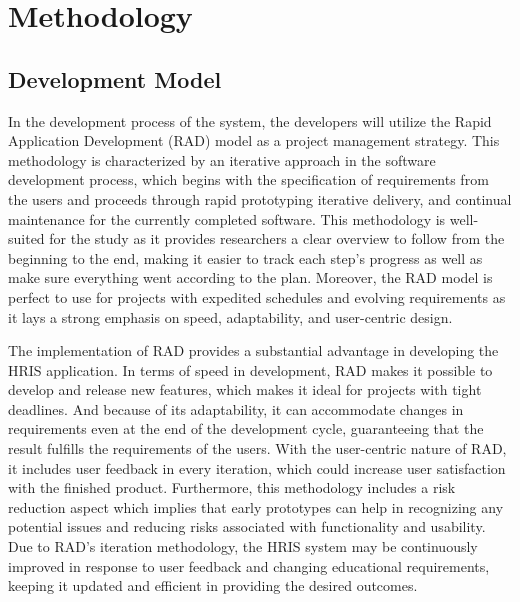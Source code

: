 \chapter{Methodology}

\section{Development Model}
In the development process of the system, the developers will utilize the Rapid Application Development (RAD) model as a project management strategy. This methodology is characterized by an iterative approach in the software development process, which begins with the specification of requirements from the users and proceeds through rapid prototyping iterative delivery, and continual maintenance for the currently completed software. This methodology is well-suited for the study as it provides researchers a clear overview to follow from the beginning to the end, making it easier to track each step's progress as well as make sure everything went according to the plan. Moreover, the RAD model is perfect to use for projects with expedited schedules and evolving requirements as it lays a strong emphasis on speed, adaptability, and user-centric design. 

The implementation of RAD provides a substantial advantage in developing the HRIS application. In terms of speed in development, RAD makes it possible to develop and release new features, which makes it ideal for projects with tight deadlines. And because of its adaptability, it can accommodate changes in requirements even at the end of the development cycle, guaranteeing that the result fulfills the requirements of the users. With the user-centric nature of RAD, it includes user feedback in every iteration, which could increase user satisfaction with the finished product. Furthermore, this methodology includes a risk reduction aspect which implies that early prototypes can help in recognizing any potential issues and reducing risks associated with functionality and usability. Due to RAD's iteration methodology, the HRIS system may be continuously improved in response to user feedback and changing educational requirements, keeping it updated and efficient in providing the desired outcomes.

